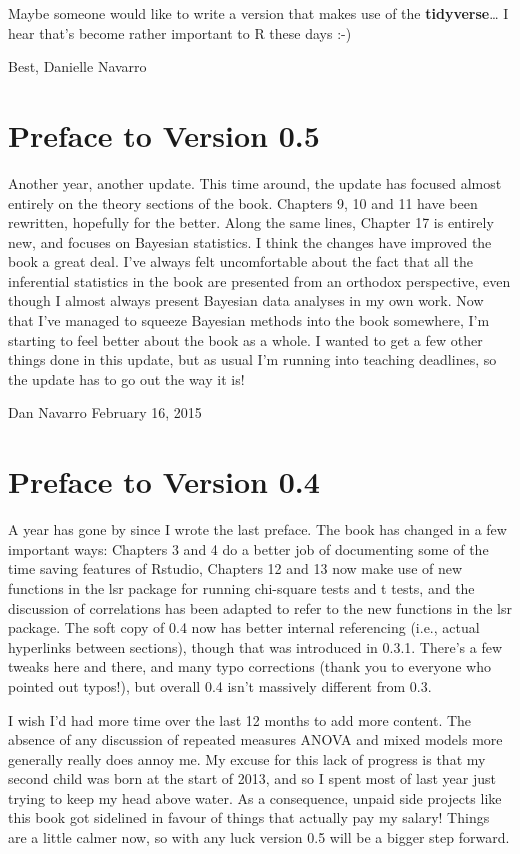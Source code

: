 \documentclass[]{book}
\begin{document}
Maybe someone would like to write a version that makes use of the \textbf{tidyverse}\ldots{} I hear that's become rather important to R these days :-)

Best,
Danielle Navarro

\hypertarget{preface-to-version-0.5}{%
\section{Preface to Version 0.5}\label{preface-to-version-0.5}}

Another year, another update. This time around, the update has focused almost entirely on the theory sections of the book. Chapters 9, 10 and 11 have been rewritten, hopefully for the better. Along the same lines, Chapter 17 is entirely new, and focuses on Bayesian statistics. I think the changes have improved the book a great deal. I've always felt uncomfortable about the fact that all the inferential statistics in the book are presented from an orthodox perspective, even though I almost always present Bayesian data analyses in my own work. Now that I've managed to squeeze Bayesian methods into the book somewhere, I'm starting to feel better about the book as a whole. I wanted to get a few other things done in this update, but as usual I'm running into teaching deadlines, so the update has to go out the way it is!

Dan Navarro
February 16, 2015

\hypertarget{preface-to-version-0.4}{%
\section{Preface to Version 0.4}\label{preface-to-version-0.4}}

A year has gone by since I wrote the last preface. The book has changed in a few important ways: Chapters 3 and 4 do a better job of documenting some of the time saving features of Rstudio, Chapters 12 and 13 now make use of new functions in the lsr package for running chi-square tests and t tests, and the discussion of correlations has been adapted to refer to the new functions in the lsr package. The soft copy of 0.4 now has better internal referencing (i.e., actual hyperlinks between sections), though that was introduced in 0.3.1. There's a few tweaks here and there, and many typo corrections (thank you to everyone who pointed out typos!), but overall 0.4 isn't massively different from 0.3.

I wish I'd had more time over the last 12 months to add more content. The absence of any discussion of repeated measures ANOVA and mixed models more generally really does annoy me. My excuse for this lack of progress is that my second child was born at the start of 2013, and so I spent most of last year just trying to keep my head above water. As a consequence, unpaid side projects like this book got sidelined in favour of things that actually pay my salary! Things are a little calmer now, so with any luck version 0.5 will be a bigger step forward.
\end{document}
